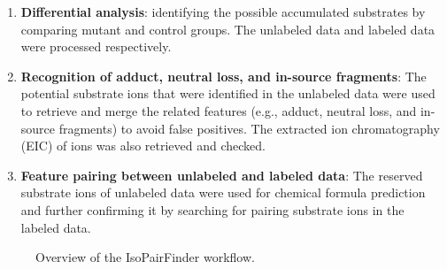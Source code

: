 \documentclass[
  letterpaper,
  DIV=11,
  numbers=noendperiod]{scrreprt}
\providecommand{\tightlist}{%
  \setlength{\itemsep}{0pt}\setlength{\parskip}{0pt}}
\begin{document}
\begin{enumerate}
\def\labelenumi{\arabic{enumi}.}
\tightlist
\item
  \textbf{Differential analysis}: identifying the possible accumulated
  substrates by comparing mutant and control groups. The unlabeled data
  and labeled data were processed respectively.
\item
  \textbf{Recognition of adduct, neutral loss, and in-source fragments}:
  The potential substrate ions that were identified in the unlabeled
  data were used to retrieve and merge the related features (e.g.,
  adduct, neutral loss, and in-source fragments) to avoid false
  positives. The extracted ion chromatography (EIC) of ions was also
  retrieved and checked.
\item
  \textbf{Feature pairing between unlabeled and labeled data}: The
  reserved substrate ions of unlabeled data were used for chemical
  formula prediction and further confirming it by searching for pairing
  substrate ions in the labeled data.
\end{enumerate}

\begin{figure}


\caption{\label{fig-figure3-1}Overview of the IsoPairFinder workflow.}

\end{figure}%
\end{document}
